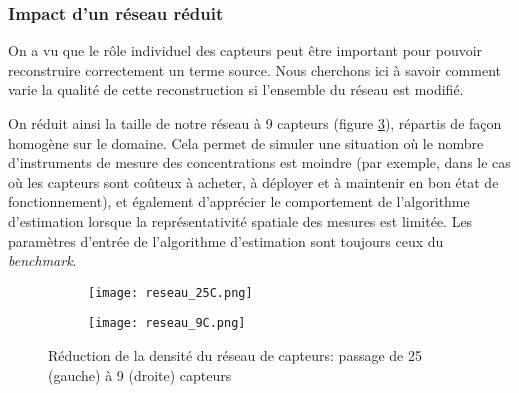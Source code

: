 \subsubsection{Impact d'un réseau réduit}

On a vu que le rôle individuel des capteurs peut être important pour pouvoir reconstruire correctement un terme source. Nous cherchons ici à savoir comment varie la qualité de cette reconstruction si l'ensemble du réseau est modifié.

On réduit ainsi la taille de notre réseau à 9 capteurs (figure \ref{fig_reseaux_25_9}), répartis de façon homogène sur le domaine. Cela permet de simuler une situation où le nombre d'instruments de mesure des concentrations est moindre (par exemple, dans le cas où les capteurs sont coûteux à acheter, à déployer {et à maintenir en bon état de fonctionnement}), et également d'apprécier le comportement de l'algorithme d'estimation lorsque la représentativité spatiale des mesures est limitée. Les paramètres d'entrée de l'algorithme d'estimation sont toujours ceux du \textit{benchmark}.\\

\begin{figure}[h!]
	\centering
	\begin{subfigure}[t]{0.5\textwidth}
		\centering
		\texttt{[image: reseau\_25C.png]}
		\caption{}
		\label{reseau_25C}
	\end{subfigure}%
	\begin{subfigure}[t]{0.5\textwidth}
		\centering
		\texttt{[image: reseau\_9C.png]}
		\caption{}
		\label{reseau_9C}
	\end{subfigure}
	\caption{Réduction de la densité du réseau de capteurs: passage de 25 (gauche) à 9 (droite) capteurs}
	\label{fig_reseaux_25_9}
\end{figure}


